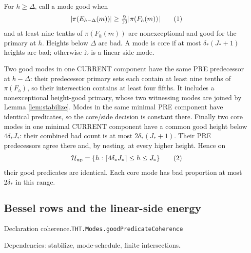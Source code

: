 \documentclass[11pt]{article}
\theoremstyle{definition}
\newcommand{\eqtag}[1]{\refstepcounter{equation}\tag{\theequation}\label{#1}}
\numberwithin{equation}{section}
\newcommand{\bp}[3]{\par\smallskip\begingroup\footnotesize
\noindent\hypertarget{bp:#1}{\textsf{Declaration #1.}}\quad\nolinkurl{#2}\par
\noindent\textsf{Dependencies:} #3.\par\endgroup\smallskip}
\begin{document}
For $h\ge\Delta$, call a mode good when
\[
 |\pi(E_{h-\Delta}(m))|\ge\tfrac9{10}|\pi(F_h(m))|
 \eqtag{eq:good}
\]
and at least nine tenths of $\pi(F_h(m))$ are nonexceptional and good for the primary at $h$. Heights below $\Delta$ are bad. A mode is core if at most $\delta_*(J_*+1)$ heights are bad; otherwise it is a linear-side mode.

Two good modes in one CURRENT component have the same PRE predecessor at $h-\Delta$: their predecessor primary sets each contain at least nine tenths of $\pi(F_h)$, so their intersection contains at least four fifths. It includes a nonexceptional height-good primary, whose two witnessing modes are joined by Lemma \ref{lem:stabilize}. Modes in the same minimal PRE component have identical predicates, so the core/side decision is constant there. Finally two core modes in one minimal CURRENT component have a common good height below $4\delta_*J_*$: their combined bad count is at most $2\delta_*(J_*+1)$. Their PRE predecessors agree there and, by nesting, at every higher height. Hence on
\[
 \mathcal H_{\rm up}=\{h:\lceil4\delta_*J_*\rceil\le h\le J_*\}
 \eqtag{eq:upper-heights}
\]
their good predicates are identical. Each core mode has bad proportion at most $2\delta_*$ in this range.

\subsection{Bessel rows and the linear-side energy}
\bp{coherence}{THT.Modes.goodPredicateCoherence}{stabilize, mode-schedule, finite intersections}
\end{document}
